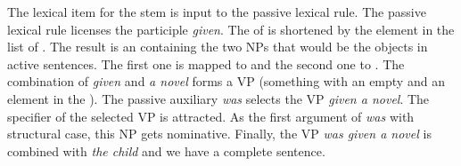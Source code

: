 The lexical item for the stem  is input to the passive lexical rule. The passive lexical
rule licenses the participle \emph{given}. The \argst of  is shortened by the element in
the \da list of  . The result is an \argstl containing the two NPs that would be the
objects in active sentences. The first one  is mapped to \spr and the second one 
to \comps. The combination of \emph{given} and \emph{a novel} forms a VP (something with an empty
\compsl and an element in the \sprl). The passive auxiliary \emph{was} selects the VP \emph{given a
  novel}. 
The specifier of the selected VP  is attracted. As the first argument of
\emph{was} with structural case, this NP gets nominative. Finally, the VP \emph{was given a novel}
is combined with \emph{the child} and we have a complete sentence.

